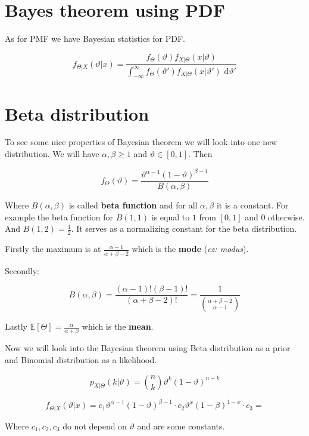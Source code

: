 \section{Bayes theorem using PDF}

As for PMF we have Bayesian statistics for PDF.

$$
f_{\Theta \vert X}(\vartheta \vert x) = \frac{f_{\Theta}(\vartheta) f_{X \vert \Theta}(x \vert \vartheta)}{\int_{-\infty}^{\infty} f_{\Theta}(\vartheta') f_{X \vert \Theta} (x \vert \vartheta') \text{ d} \vartheta'}
$$

\section{Beta distribution}

To see some nice properties of Bayesian theorem we will look into one new distribution. We will have $\alpha, \beta \geq 1$ and $\vartheta \in [0,1]$. Then

$$
f_{\Theta} (\vartheta) = \frac{\vartheta^{\alpha - 1} (1-\vartheta)^{\beta - 1}}{B (\alpha,\beta)}
$$

Where $B(\alpha, \beta)$ is called \textbf{beta function} and for all $\alpha, \beta$ it is a constant. For example the beta function for $B(1,1)$ is equal to $1$ from $[0,1]$ and $0$ otherwise. And $B(1,2) = \frac{1}{2}$. It serves as a normalizing constant for the beta distribution.

Firstly the maximum is at $\frac{\alpha -1}{\alpha + \beta - 2}$ which is the \textbf{mode} (\textit{cz: modus}).

Secondly:

$$
B(\alpha, \beta) = \frac{(\alpha - 1)! (\beta - 1)!}{(\alpha+\beta-2)!} = \frac{1}{\binom{\alpha + \beta - 2}{\alpha -1}}
$$

Lastly $\mathbb{E} [\Theta] = \frac{\alpha}{\alpha + \beta}$ which is the \textbf{mean}.

Now we will look into the Bayesian theorem using Beta distribution as a prior and Binomial distribution as a likelihood.

$$
p_{X \vert \Theta}(k \vert \vartheta) = \binom{n}{k} \vartheta^{k} (1-\vartheta)^{n-k}
$$

$$
f_{\Theta \vert X}(\vartheta \vert x) = c_{1} \vartheta^{\alpha - 1}(1 - \vartheta)^{\beta - 1} \cdot c_{2} \vartheta^{x} (1- \beta)^{1-x} \cdot c_{3} =
$$

Where $c_{1},c_{2},c_{3}$ do not depend on $\vartheta$ and are some constants.

